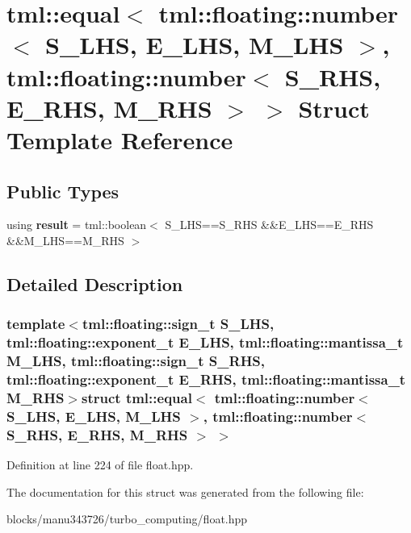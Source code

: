 \hypertarget{structtml_1_1equal_3_01tml_1_1floating_1_1number_3_01_s___l_h_s_00_01_e___l_h_s_00_01_m___l_h_s_74295ffdf6f6a5f2ae13f6871d9382a1}{\section{tml\+:\+:equal$<$ tml\+:\+:floating\+:\+:number$<$ S\+\_\+\+L\+H\+S, E\+\_\+\+L\+H\+S, M\+\_\+\+L\+H\+S $>$, tml\+:\+:floating\+:\+:number$<$ S\+\_\+\+R\+H\+S, E\+\_\+\+R\+H\+S, M\+\_\+\+R\+H\+S $>$ $>$ Struct Template Reference}
\label{structtml_1_1equal_3_01tml_1_1floating_1_1number_3_01_s___l_h_s_00_01_e___l_h_s_00_01_m___l_h_s_74295ffdf6f6a5f2ae13f6871d9382a1}
}
\subsection*{Public Types}
\begin{DoxyCompactItemize}
\item 
\hypertarget{structtml_1_1equal_3_01tml_1_1floating_1_1number_3_01_s___l_h_s_00_01_e___l_h_s_00_01_m___l_h_s_74295ffdf6f6a5f2ae13f6871d9382a1_a5d807f7a62c9549151ff253d04cf9398}{using {\bfseries result} = tml\+::boolean$<$ S\+\_\+\+L\+H\+S==S\+\_\+\+R\+H\+S \&\&E\+\_\+\+L\+H\+S==E\+\_\+\+R\+H\+S \&\&M\+\_\+\+L\+H\+S==M\+\_\+\+R\+H\+S $>$}\label{structtml_1_1equal_3_01tml_1_1floating_1_1number_3_01_s___l_h_s_00_01_e___l_h_s_00_01_m___l_h_s_74295ffdf6f6a5f2ae13f6871d9382a1_a5d807f7a62c9549151ff253d04cf9398}

\end{DoxyCompactItemize}


\subsection{Detailed Description}
\subsubsection*{template$<$tml\+::floating\+::sign\+\_\+t S\+\_\+\+L\+H\+S, tml\+::floating\+::exponent\+\_\+t E\+\_\+\+L\+H\+S, tml\+::floating\+::mantissa\+\_\+t M\+\_\+\+L\+H\+S, tml\+::floating\+::sign\+\_\+t S\+\_\+\+R\+H\+S, tml\+::floating\+::exponent\+\_\+t E\+\_\+\+R\+H\+S, tml\+::floating\+::mantissa\+\_\+t M\+\_\+\+R\+H\+S$>$struct tml\+::equal$<$ tml\+::floating\+::number$<$ S\+\_\+\+L\+H\+S, E\+\_\+\+L\+H\+S, M\+\_\+\+L\+H\+S $>$, tml\+::floating\+::number$<$ S\+\_\+\+R\+H\+S, E\+\_\+\+R\+H\+S, M\+\_\+\+R\+H\+S $>$ $>$}



Definition at line 224 of file float.\+hpp.



The documentation for this struct was generated from the following file\+:\begin{DoxyCompactItemize}
\item 
blocks/manu343726/turbo\+\_\+computing/float.\+hpp\end{DoxyCompactItemize}
